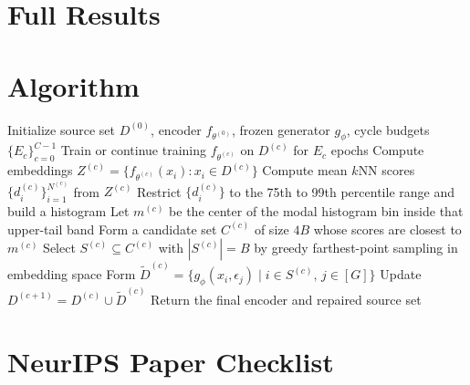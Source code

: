 \documentclass{article}
\begin{document}
\section{Full Results}
\label{app:full-results}















\section{Algorithm}
\begin{algorithm}[H]
\caption{BRIDGE training loop with mode-window selection}
\begin{algorithmic}[1]
\STATE Initialize source set $D^{(0)}$, encoder $f_{\theta^{(0)}}$, frozen generator $g_{\phi}$, cycle budgets $\{E_c\}_{c=0}^{C-1}$
    \STATE Train or continue training $f_{\theta^{(c)}}$ on $D^{(c)}$ for $E_c$ epochs
    \STATE Compute embeddings $Z^{(c)} = \{f_{\theta^{(c)}}(x_i) : x_i \in D^{(c)}\}$
    \STATE Compute mean $k$NN scores $\{d_i^{(c)}\}_{i=1}^{N^{(c)}}$ from $Z^{(c)}$
    \STATE Restrict $\{d_i^{(c)}\}$ to the 75th to 99th percentile range and build a histogram
    \STATE Let $m^{(c)}$ be the center of the modal histogram bin inside that upper-tail band
    \STATE Form a candidate set $C^{(c)}$ of size $4B$ whose scores are closest to $m^{(c)}$
    \STATE Select $S^{(c)} \subseteq C^{(c)}$ with $|S^{(c)}| = B$ by greedy farthest-point sampling in embedding space
    \STATE Form $\widetilde{D}^{(c)} = \{g_{\phi}(x_i, \epsilon_j) \mid i \in S^{(c)},\, j \in [G]\}$
    \STATE Update $D^{(c+1)} = D^{(c)} \cup \widetilde{D}^{(c)}$
\ENDFOR
\STATE Return the final encoder and repaired source set
\end{algorithmic}
\end{algorithm}

\FloatBarrier
\newpage
\section*{NeurIPS Paper Checklist}
\end{document}
